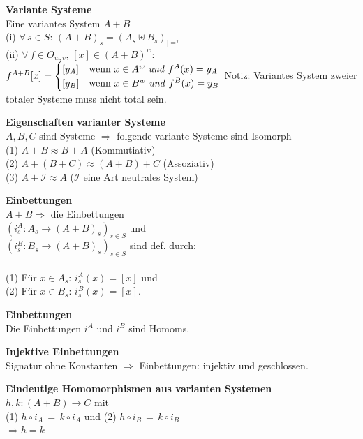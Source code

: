 \begin{multicols}{2}
\textbf{ Variante Systeme} \\
Eine variantes System $A  + B$  \\
(i) $\forall \, s \in S:\,\left(A + B\right)_{s}= \left(A_{s}\uplus B_{s}\right)_{|\equiv^{\mathcal{I}}}$ \\
(ii) $\forall \, f\in O_{w,v},\, [x] \in\left(A + B\right)^{w}:$\\$f^{A + B}[x]= \begin{cases}
\left[y_{A}\right] & \textrm{wenn \ensuremath{x\in A^{w}\textrm{ \emph{und} }}}f^{A}(x)=y_{A}\\
\left[y_{B}\right] & \textrm{wenn \ensuremath{x\in B^{w}\textrm{ \emph{und} }}}f^{B}(x)=y_{B}
\end{cases}$
Notiz: Variantes System zweier totaler Systeme muss nicht total sein.


\textbf{ Eigenschaften varianter Systeme} \\
$A,B,C$ sind Systeme $\Rightarrow$ folgende variante Systeme sind Isomorph \\
(1) $A + B \approx B + A$ (Kommutiativ)\\
(2) $A + (B + C) \approx (A + B) + C$ (Assoziativ) \\
(3) $A + \mathcal{I} \approx A$ ($\mathcal{I}$ eine Art neutrales System)


\textbf{ Einbettungen} \\
$A + B \Rightarrow$  die Einbettungen \\ 
$\left(i_{s}^{A}:A_{s}\rightarrow\left(A+B\right)_{s}\right)_{s\in S}$
und \\ $\left(i_{s}^{B}:B_{s}\rightarrow\left(A+B\right)_{s}\right)_{s\in S}$
sind def. durch: \\ \\ (1) Für $x\in A_{s}$: $i_{s}^{A}(x)=[x]$ und \\ (2) Für $x\in B_{s}$: $i_{s}^{B}(x)=[x]$.

\textbf{ Einbettungen} \\
Die Einbettungen $i^A$ und $i^B$ sind Homoms.

\textbf{ Injektive Einbettungen} \\
Signatur ohne Konstanten $\Rightarrow$ Einbettungen: injektiv und geschlossen.

\textbf{ Eindeutige Homomorphismen aus varianten Systemen} \\
$h,k: (A+B) \rightarrow C$ \homos mit \\
(1) $h \circ i_A \, = \, k \circ i_A$ und 
(2) $h \circ i_B \, = \, k \circ i_B$\\$ \Rightarrow h = k$
\end{multicols}

